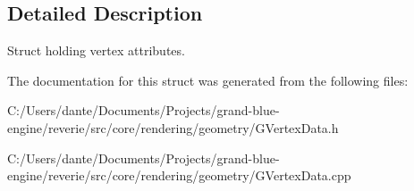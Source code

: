 \subsection{Detailed Description}
Struct holding vertex attributes. 

The documentation for this struct was generated from the following files\+:\begin{DoxyCompactItemize}
\item 
C\+:/\+Users/dante/\+Documents/\+Projects/grand-\/blue-\/engine/reverie/src/core/rendering/geometry/G\+Vertex\+Data.\+h\item 
C\+:/\+Users/dante/\+Documents/\+Projects/grand-\/blue-\/engine/reverie/src/core/rendering/geometry/G\+Vertex\+Data.\+cpp\end{DoxyCompactItemize}

